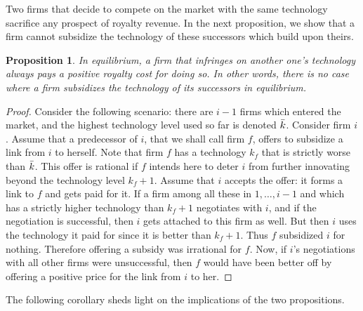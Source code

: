 \documentclass{article}
\newtheorem{proposition}{Proposition}
\begin{document}
Two firms that decide to compete on the market with the same technology sacrifice any prospect of royalty revenue. In the next proposition, we show that a firm cannot subsidize the technology of these successors which build upon theirs. \\

\begin{proposition}\label{prop:positiveroyality}
In equilibrium, a firm that infringes on another one's technology always pays a positive royalty cost for doing so. In other words, there is no case where a firm subsidizes the technology of its successors in equilibrium.
\end{proposition}
\begin{proof}
Consider the following scenario: there are $i-1$ firms which entered the market, and the highest technology level used so far is denoted $\Bar{k}$. Consider firm $i$. Assume that a predecessor of $i$, that we shall call firm $f$, offers to subsidize a link from $i$ to herself. Note that firm $f$ has a technology $k_f$ that is strictly worse than $\Bar{k}$. This offer is rational if $f$ intends here to deter $i$ from further innovating beyond the technology level $k_f+1$. Assume that $i$ accepts the offer: it forms a link to $f$ and gets paid for it. If a firm among all these in $1,\ldots, i-1$ and which has a strictly higher technology than $k_f+1$ negotiates with $i$, and if the negotiation is successful, then $i$ gets attached to this firm as well. But then $i$ uses the technology it paid for since it is better than $k_f+1$. Thus $f$ subsidized $i$ for nothing. Therefore offering a subsidy was irrational for $f$. Now, if $i$'s negotiations with all other firms were unsuccessful, then $f$ would have been better off by offering a positive price for the link from $i$ to her. 
\end{proof}

The following corollary sheds light on the implications of the two propositions. \\
\end{document}

